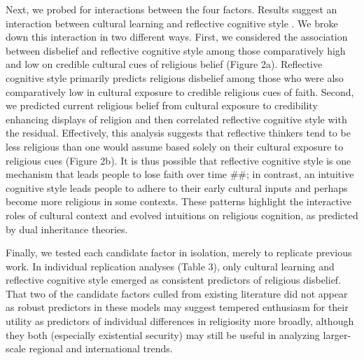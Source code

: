 \documentclass[]{article}
\begin{document}
Next, we probed for interactions between the four factors. Results
suggest an interaction between cultural learning and reflective
cognitive style . We broke down this interaction in two different ways.
First, we considered the association between disbelief and reflective
cognitive style among those comparatively high and low on credible
cultural cues of religious belief (Figure 2a). Reflective cognitive
style primarily predicts religious disbelief among those who were also
comparatively low in cultural exposure to credible religious cues of
faith. Second, we predicted current religious belief from cultural
exposure to credibility enhancing displays of religion and then
correlated reflective cognitive style with the residual. Effectively,
this analysis suggests that reflective thinkers tend to be less
religious than one would assume based solely on their cultural exposure
to religious cues (Figure 2b). It is thus possible that reflective
cognitive style is one mechanism that leads people to lose faith over
time \#\#; in contrast, an intuitive cognitive style leads people to
adhere to their early cultural inputs and perhaps become more religious
in some contexts. These patterns highlight the interactive roles of
cultural context and evolved intuitions on religious cognition, as
predicted by dual inheritance theories.

Finally, we tested each candidate factor in isolation, merely to
replicate previous work. In individual replication analyses (Table 3),
only cultural learning and reflective cognitive style emerged as
consistent predictors of religious disbelief. That two of the candidate
factors culled from existing literature did not appear as robust
predictors in these models may suggest tempered enthusiasm for their
utility as predictors of individual differences in religiosity more
broadly, although they both (especially existential security) may still
be useful in analyzing larger-scale regional and international trends.
\end{document}
